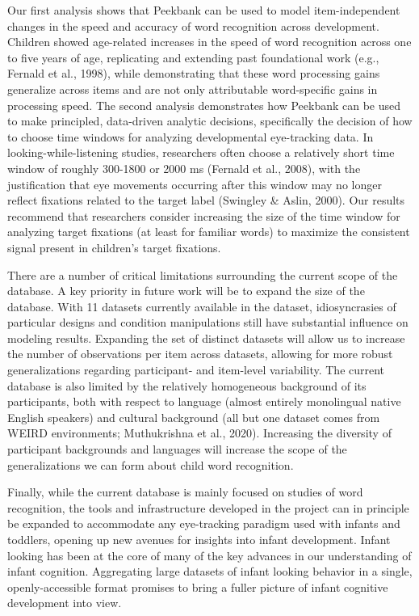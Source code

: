 \documentclass[10pt, letterpaper]{article}
\begin{document}
Our first analysis shows that Peekbank can be used to model
item-independent changes in the speed and accuracy of word recognition
across development. Children showed age-related increases in the speed
of word recognition across one to five years of age, replicating and
extending past foundational work (e.g., Fernald et al., 1998), while
demonstrating that these word processing gains generalize across items
and are not only attributable word-specific gains in processing speed.
The second analysis demonstrates how Peekbank can be used to make
principled, data-driven analytic decisions, specifically the decision of
how to choose time windows for analyzing developmental eye-tracking
data. In looking-while-listening studies, researchers often choose a
relatively short time window of roughly 300-1800 or 2000 ms (Fernald et
al., 2008), with the justification that eye movements occurring after
this window may no longer reflect fixations related to the target label
(Swingley \& Aslin, 2000). Our results recommend that researchers
consider increasing the size of the time window for analyzing target
fixations (at least for familiar words) to maximize the consistent
signal present in children's target fixations.

There are a number of critical limitations surrounding the current scope
of the database. A key priority in future work will be to expand the
size of the database. With 11 datasets currently available in the
dataset, idiosyncrasies of particular designs and condition
manipulations still have substantial influence on modeling results.
Expanding the set of distinct datasets will allow us to increase the
number of observations per item across datasets, allowing for more
robust generalizations regarding participant- and item-level
variability. The current database is also limited by the relatively
homogeneous background of its participants, both with respect to
language (almost entirely monolingual native English speakers) and
cultural background (all but one dataset comes from WEIRD environments;
Muthukrishna et al., 2020). Increasing the diversity of participant
backgrounds and languages will increase the scope of the generalizations
we can form about child word recognition.

Finally, while the current database is mainly focused on studies of word
recognition, the tools and infrastructure developed in the project can
in principle be expanded to accommodate any eye-tracking paradigm used
with infants and toddlers, opening up new avenues for insights into
infant development. Infant looking has been at the core of many of the
key advances in our understanding of infant cognition. Aggregating large
datasets of infant looking behavior in a single, openly-accessible
format promises to bring a fuller picture of infant cognitive
development into view.
\end{document}
